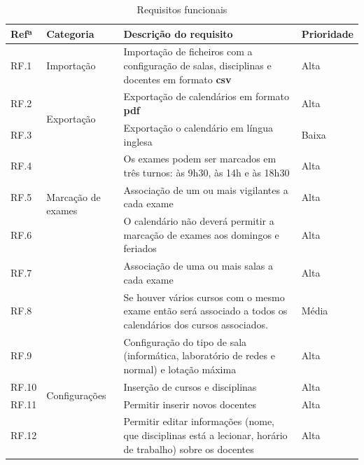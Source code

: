 \documentclass[11pt, twoside]{report}
\begin{document}
\def\arraystretch{1.5}
	\begin{center}
		\label{requisitiosfuncionais}
		\begin{longtable}{|m{1cm}|m{2.2cm}|m{10cm}|m{2cm}|}
			\caption{Requisitos funcionais}\\
			
			\hline			
			\textbf{Refª }	& \textbf{Categoria}&\textbf{Descrição do requisito} & \textbf{Prioridade} \\
			\hline
			
			
			RF.1 &Importação& Importação de ficheiros com a configuração de salas, disciplinas e docentes em formato \textbf{csv} & Alta \\
			\hline
			
			RF.2 &\multirow{2}{2cm}{Exportação}& Exportação de calendários em formato \textbf{pdf} & Alta \\
			
			RF.3 && Exportação o calendário em língua inglesa & Baixa \\
			\hline
			
			RF.4 &\multirow{3}{2cm}{Marcação de exames}& Os exames podem ser marcados em três turnos: às 9h30, às 14h e às 18h30 & Alta \\
			
			RF.5 && Associação de um ou mais vigilantes a cada exame & Alta \\
			
			RF.6 && O calendário não deverá permitir a marcação de exames aos domingos e feriados & Alta \\
			
			RF.7 &&	Associação de uma ou mais salas a cada exame & Alta\\
			
			RF.8 && Se houver vários cursos com o mesmo exame então será associado a todos os calendários dos cursos associados. & Média\\
			\hline
		
			RF.9 &\multirow{7}{2cm}{Configurações}& Configuração do tipo de sala (informática, laboratório de redes e normal) e lotação máxima & Alta \\
			
			RF.10 & & Inserção de cursos e disciplinas & Alta\\
			
			RF.11 && Permitir inserir novos docentes & Alta\\
			
			RF.12 && Permitir editar informações (nome, que disciplinas está a lecionar, horário de trabalho) sobre os docentes & Alta\\
			

\end{longtable}
\end{center}
\end{document}
